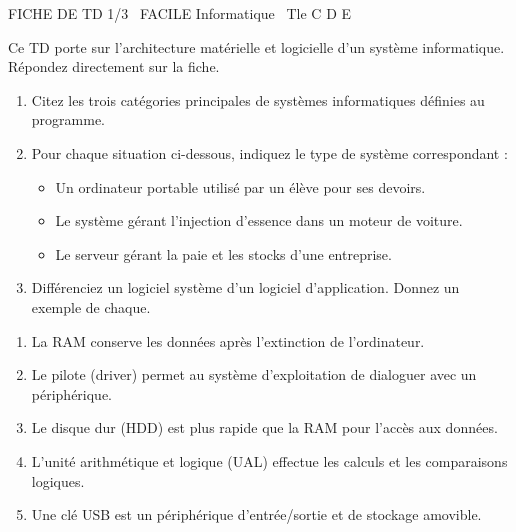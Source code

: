 \documentclass[11pt]{article}
\begin{document}
\begin{tcolorbox}[enhanced,colback=popink,colframe=popink,arc=10pt,boxrule=0pt,left=12pt,right=12pt,top=9pt,bottom=9pt]
{\color{white}\popxbold\small FICHE DE TD 1/3 \textbullet\ FACILE \hfill Informatique \textbullet\ Tle C D E\par}
\end{tcolorbox}
\vspace{4pt}
Ce TD porte sur l'architecture matérielle et logicielle d'un système informatique. Répondez directement sur la fiche.

\begin{exercice}
\begin{enumerate}
    \item Citez les trois catégories principales de systèmes informatiques définies au programme.
    \item Pour chaque situation ci-dessous, indiquez le type de système correspondant :
    \begin{itemize}
        \item Un ordinateur portable utilisé par un élève pour ses devoirs.
        \item Le système gérant l'injection d'essence dans un moteur de voiture.
        \item Le serveur gérant la paie et les stocks d'une entreprise.
    \end{itemize}
    \item Différenciez un logiciel système d'un logiciel d'application. Donnez un exemple de chaque.
\end{enumerate}
\end{exercice}

\begin{exercice}
\begin{enumerate}
    \item La RAM conserve les données après l'extinction de l'ordinateur.
    \item Le pilote (driver) permet au système d'exploitation de dialoguer avec un périphérique.
    \item Le disque dur (HDD) est plus rapide que la RAM pour l'accès aux données.
    \item L'unité arithmétique et logique (UAL) effectue les calculs et les comparaisons logiques.
    \item Une clé USB est un périphérique d'entrée/sortie et de stockage amovible.
\end{enumerate}
\end{exercice}
\end{document}
